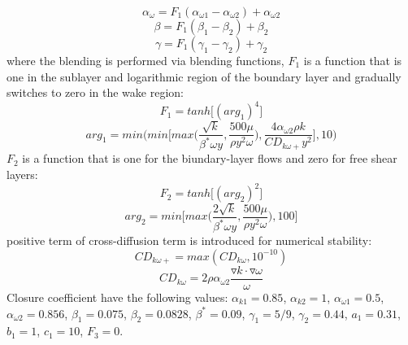 \begin{equation}
{{\alpha}_{\omega}}={F_1}({{\alpha}_{\omega 1}}-{{\alpha}_{\omega 2}})+{{\alpha}_{\omega 2}}
\end{equation}
\begin{equation}
{{\beta}}={F_1}{({{\beta}_1}-{{\beta}_2})}+{{\beta}_2}
\end{equation}
\begin{equation}
{\gamma}={F_1}({{\gamma}_1}-{{\gamma}_2})+{{\gamma}_2}
\end{equation}
where the blending is performed via blending functions, $F_1$ is a function that is one in the sublayer and logarithmic region of the boundary layer and gradually switches to zero in the wake region:
\begin{equation}
{F_1}=tanh\bigg[(arg_1)^4 \bigg]
\end{equation}
\begin{equation}
{arg_1}=min\Bigg(min\Bigg[max\Bigg({{\frac{\sqrt{k}}{{{\beta}^*}\omega y}},{\frac{500\mu}{\rho {y^2}\omega}}\Bigg),{{\frac{4{{{\alpha}_{{\omega {2}}}}{\rho} {k}}}{CD_{k \omega +}{y^2}}}}\Bigg],10 }\Bigg)
\end{equation}
$F_2$ is a function that is one for the biundary-layer flows and zero for free shear layers:
\begin{equation}
{F_2}=tanh\bigg[(arg_2)^2\bigg]
\end{equation}
\begin{equation}
{arg_2}=min\Bigg[max\Bigg({\frac{2 \sqrt{k}}{{{\beta}^*}\omega y}},{\frac{500 \mu}{{\rho}{y^2}{\omega}}}\Bigg),100\Bigg]
\end{equation}
positive term of cross-diffusion term is introduced for numerical stability:
\begin{equation}
{CD_{k \omega +}}=max({CD_{k \omega}},{10}^{-10})
\end{equation}
\begin{equation}
{CD_{k \omega}}={2 \rho {\alpha}_{\omega 2}}{\frac{{\triangledown k}\cdot{\triangledown {\omega}}}{\omega}}
\end{equation}
Closure coefficient have the following values: ${{\alpha}_{k1}}=0.85$, ${{\alpha}_{k2}}=1$, ${{\alpha}_{\omega 1}}=0.5$, ${{\alpha}_{\omega 2}}=0.856$, ${{\beta}_1}=0.075$, ${{\beta}_2}=0.0828$,
${{\beta}^*}=0.09$, ${{\gamma}_1}=5/9$, ${{\gamma}_2}=0.44$, ${a_1}=0.31$, ${b_1}=1$, ${c_1}=10$, ${F_3}=0$.
